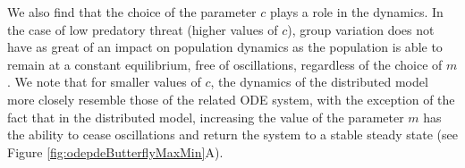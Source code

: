 \documentclass[review,authoryear]{elsarticle}
\newcommand{\origM}{m}
\begin{document}
We also find that the choice of the parameter $c$ plays a role in the dynamics. In the case of low predatory threat (higher values of $c$), group variation does not have as great
of an impact on population dynamics as the population is able to remain at a constant equilibrium, free of oscillations, regardless of the choice of $\origM$. We note that for smaller values of $c$, the dynamics of the distributed model more closely resemble those of the related ODE system, with the exception of the fact that in the distributed model, increasing the value of the parameter $\origM$ has the ability to cease oscillations and return the system to a stable steady state (see Figure \ref{fig:odepdeButterflyMaxMin}A).





\end{document}

